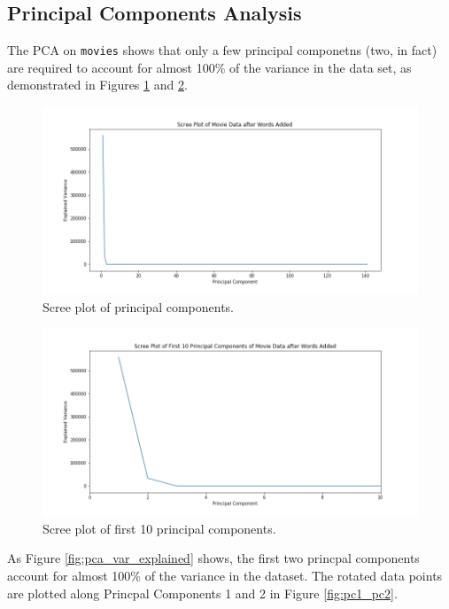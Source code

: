 \documentclass[12pt, oneside]{article}   	%
\begin{document}
\subsection{Principal Components Analysis}
\label{section:pca_results}

The PCA on \texttt{movies} shows that only a few principal componetns (two, in fact) are required to account for almost 100\% of the variance in the data set, as demonstrated in Figures \ref{fig:scree_whole} and \ref{fig:scree_first_10}.

\begin{figure}%
\includegraphics[width=\textwidth]{scree_whole}
\caption{\label{fig:scree_whole}Scree plot of principal components.}
\end{figure}

\begin{figure}%
\includegraphics[width=\textwidth]{scree_first_10}
\caption{\label{fig:scree_first_10}Scree plot of first 10 principal components.}
\end{figure}

As Figure \ref{fig:pca_var_explained} shows, the first two princpal components account for almost 100\% of the variance in the dataset. The rotated data points are plotted along Princpal Components 1 and 2 in Figure \ref{fig:pc1_pc2}.
\end{document}
